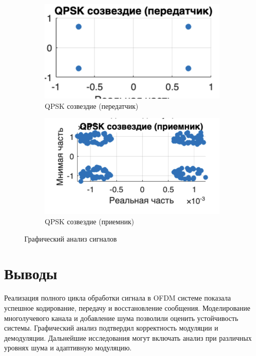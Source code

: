 \documentclass[a4paper,14pt,oneside,openany]{memoir}
\begin{document}
\begin{figure}[ht]
\begin{subfigure}{0.45\textwidth}
			\label{fig:signal_analysis:c}
		\end{subfigure}
		\begin{subfigure}{0.45\textwidth}
			\centering
			\includegraphics{qpsk_tx.png}
			\caption{QPSK созвездие (передатчик)}
			\label{fig:signal_analysis:d}
		\end{subfigure}
		\hfill
		\begin{subfigure}{0.45\textwidth}
			\centering
			\includegraphics{qpsk_rx.png}
			\caption{QPSK созвездие (приемник)}
			\label{fig:signal_analysis:e}
		\end{subfigure}
		\caption{Графический анализ сигналов}
		\label{fig:signal_analysis}
	\end{figure}
	
	\section{Выводы}
	
	Реализация полного цикла обработки сигнала в OFDM системе показала успешное кодирование, передачу и восстановление сообщения. Моделирование многолучевого канала и добавление шума позволили оценить устойчивость системы. Графический анализ подтвердил корректность модуляции и демодуляции. Дальнейшие исследования могут включать анализ при различных уровнях шума и адаптивную модуляцию.
	
	\printbibliography[title=Список использованных источников]
	
\end{document}
